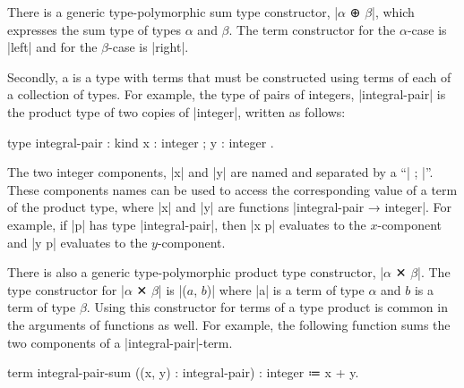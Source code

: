 There is a generic type-polymorphic sum type constructor, \code|$α$ ⊕ $β$|, which expresses the sum type of types $α$ and $β$.
The term constructor for the $α$-case is \code|left| and for the $β$-case is \code|right|.

Secondly, a  is a type with terms that must be constructed using terms of each of a collection of  types.
For example, the type of pairs of integers, \code|integral-pair| is the product type of two copies of \code|integer|, written as follows:
%
\begin{snippet}
type integral-pair : kind
  { x : integer
  ; y : integer }.
\end{snippet}
%
The two integer components, \code|x| and \code|y| are named and separated by a ``\code| ; |''.
These components names can be used to access the corresponding value of a term of the product type, where \code|x| and \code|y| are functions \code|integral-pair → integer|.
For example, if \code|p| has type \code|integral-pair|, then \code|x p| evaluates to the $x$-component and \code|y p| evaluates to the $y$-component.

There is also a generic type-polymorphic product type constructor, \code|$α$ ✕ $β$|.
The type constructor for \code|$α$ ✕ $β$| is \code|($a$, $b$)| where \code|a| is a term of type $α$ and $b$ is a term of type $β$.
Using this constructor for terms of a type product is common in the arguments of functions as well.
For example, the following function sums the two components of a \code|integral-pair|-term.
%
\begin{snippet}
term integral-pair-sum ((x, y) : integral-pair) : integer ≔ x + y.
\end{snippet}
%

